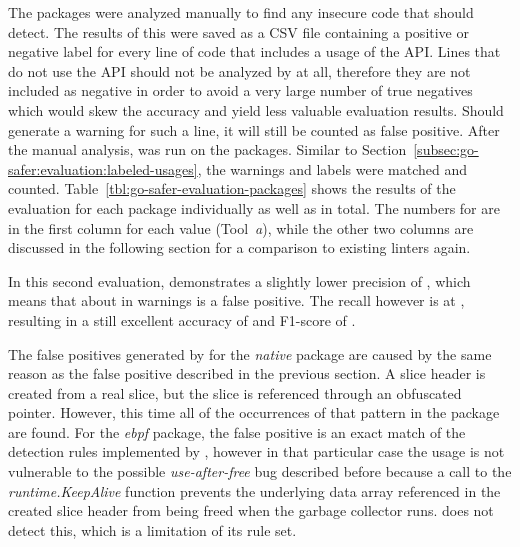 

The  packages were analyzed manually to find any insecure code that \toolSafer{} should detect.
The results of this were saved as a \acrshort{CSV} file containing a positive or negative label for every line of code
that includes a usage of the \unsafe{} \acrshort{API}.
Lines that do not use the \acrshort{API} should not be analyzed by \toolSafer{} at all, therefore they are not included
as negative in order to avoid a very large number of true negatives which would skew the accuracy and yield less
valuable evaluation results.
Should \toolSafer{} generate a warning for such a line, it will still be counted as false positive.
After the manual analysis, \toolSafer{} was run on the packages.
Similar to Section~\ref{subsec:go-safer:evaluation:labeled-usages}, the warnings and labels were matched and counted.
Table~\ref{tbl:go-safer-evaluation-packages} shows the results of the evaluation for each package individually as well
as in total.
The numbers for \toolSafer{} are in the first column for each value (Tool~\textit{a}), while the other two columns are
discussed in the following section for a comparison to existing linters again.



In this second evaluation, \toolSafer{} demonstrates a slightly lower precision of , which means that
about  in  warnings is a false positive.
The recall however is at , resulting in a still excellent accuracy of  and F1-score of
.

The false positives generated by \toolSafer{} for the \textit{native} package are caused by the same reason as the false
positive described in the previous section.
A slice header is created from a real slice, but the slice is referenced through an obfuscated pointer.
However, this time all of the occurrences of that pattern in the package are found.
For the \textit{ebpf} package, the false positive is an exact match of the detection rules implemented by \toolSafer{},
however in that particular case the usage is not vulnerable to the possible \textit{use-after-free} bug described before
because a call to the \textit{runtime.KeepAlive} function prevents the underlying data array referenced in the created
slice header from being freed when the garbage collector runs.
\toolSafer{} does not detect this, which is a limitation of its rule set.

